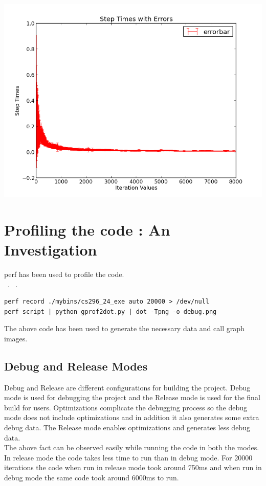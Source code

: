 \documentclass [11pt]{report}
\begin{document}
\begin{center}
\includegraphics [scale=0.7]{./images/plot03.png}
\end{center}


\section{Profiling the code : An Investigation}
perf has been used to profile the code.\\
~\cite{perftut}.
~\cite{gp2dot}.
\begin{lstlisting}
perf record ./mybins/cs296_24_exe auto 20000 > /dev/null
perf script | python gprof2dot.py | dot -Tpng -o debug.png
\end{lstlisting}
The above code has been used to generate the necessary data and call graph images. 
\subsection{Debug and Release Modes}
Debug and Release are different configurations for building the project. Debug mode is used for debugging the project and the Release mode is used for the final build for users. Optimizations complicate the debugging process so the debug mode does not include optimizations and in addition it also generates some extra debug data. The Release mode enables optimizations and generates less debug data.\\

The above fact can be observed easily while running the code in both the modes. In release mode the code takes less time to run than in debug mode. For 20000 iterations the code when run in release mode took around 750ms and when run in debug mode the same code took around 6000ms to run.\\
\end{document}
